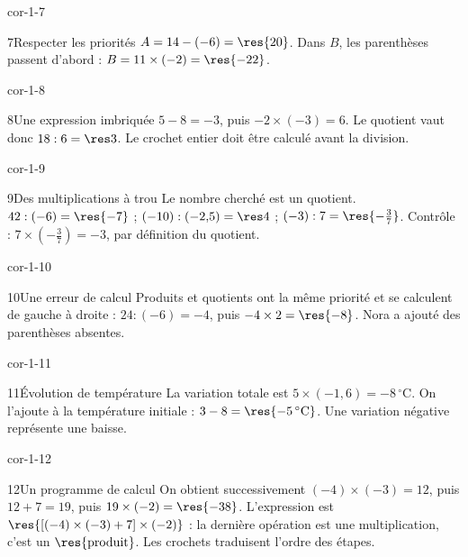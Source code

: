 \begin{blocLivre}{cor-1-7}\begin{corrige}{7}{Respecter les priorités}
$A=14-(-6)=\res{20}$. Dans $B$, les parenthèses passent d’abord : $B=11\times(-2)=\res{-22}$.
\end{corrige}\end{blocLivre}
\begin{blocLivre}{cor-1-8}\begin{corrige}{8}{Une expression imbriquée}
$5-8=-3$, puis $-2\times(-3)=6$. Le quotient vaut donc $18:6=\res3$. Le crochet entier doit être calculé avant la division.
\end{corrige}\end{blocLivre}
\begin{blocLivre}{cor-1-9}\begin{corrige}{9}{Des multiplications à trou}
Le nombre cherché est un quotient. $42:(-6)=\res{-7}$ ; $(-10):(-2{,}5)=\res4$ ; $(-3):7=\res{-\frac37}$. Contrôle : $7\times\left(-\frac37\right)=-3$, par définition du quotient.
\end{corrige}\end{blocLivre}
\begin{blocLivre}{cor-1-10}\begin{corrige}{10}{Une erreur de calcul}
Produits et quotients ont la même priorité et se calculent de gauche à droite : $24:(-6)=-4$, puis $-4\times2=\res{-8}$. Nora a ajouté des parenthèses absentes.
\end{corrige}\end{blocLivre}
\begin{blocLivre}{cor-1-11}\begin{corrige}{11}{Évolution de température}
La variation totale est $5\times(-1{,}6)=-8\,^\circ$C. On l’ajoute à la température initiale : $3-8=\res{-5\,^\circ\mathrm C}$. Une variation négative représente une baisse.
\end{corrige}\end{blocLivre}
\begin{blocLivre}{cor-1-12}\begin{corrige}{12}{Un programme de calcul}
On obtient successivement $(-4)\times(-3)=12$, puis $12+7=19$, puis $19\times(-2)=\res{-38}$. L’expression est $\res{[(-4)\times(-3)+7]\times(-2)}$ : la dernière opération est une multiplication, c’est un $\res{\text{produit}}$. Les crochets traduisent l’ordre des étapes.
\end{corrige}\end{blocLivre}
